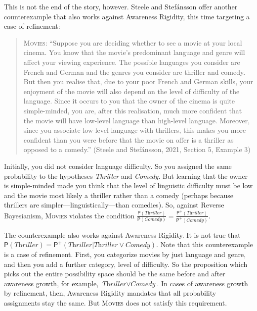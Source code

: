 \documentclass[
  11pt,
  dvipsnames,enabledeprecatedfontcommands]{scrartcl}
\newcommand{\pr}[1]{\ensuremath{\mathsf{P}(#1)}}
\newcommand{\ppr}[2]{\ensuremath{\mathsf{P}^{#1}(#2)}}
\begin{document}
This is not the end of the story, however. Steele and Stefánsson offer
another counterexample that also works against Awareness Rigidity, this
time targeting a case of refinement:

\begin{quote}
\textsc{Movies}: ``Suppose you are deciding whether to see a movie at
your local cinema. You know that the movie's predominant language and
genre will affect your viewing experience. The possible languages you
consider are French and German and the genres you consider are thriller
and comedy. But then you realise that, due to your poor French and
German skills, your enjoyment of the movie will also depend on the level
of difficulty of the language. Since it occurs to you that the owner of
the cinema is quite simple-minded, you are, after this realisation, much
more confident that the movie will have low-level language than
high-level language. Moreover, since you associate low-level language
with thrillers, this makes you more confident than you were before that
the movie on offer is a thriller as opposed to a comedy.'' (Steele and
Stefánsson, 2021, Section 5, Example 3)
\end{quote}

\noindent Initially, you did not consider language difficulty. So you
assigned the same probability to the hypotheses \textit{Thriller} and
\textit{Comedy}. But learning that the owner is simple-minded made you
think that the level of linguistic difficulty must be low and the movie
most likely a thriller rather than a comedy (perhaps because thrillers
are simpler---linguistically---than comedies). So, against Reverse
Bayesianism, \textsc{Movies} violates the condition
\(\frac{\pr{\textit{Thriller}}}{\pr{\textit{Comedy}}}=\frac{\ppr{+}{\textit{Thriller}}}{\ppr{+}{\textit{Comedy}}}\).

The counterexample also works against Awareness Rigidity. It is not true
that
\(\pr{\textit{Thriller}}=\ppr{+}{\textit{Thriller} \vert \textit{Thriller}\vee \textit{Comedy}}\).
Note that this counterexample is a case of refinement. First, you
categorize movies by just language and genre, and then you add a further
category, level of difficulty. So the proposition which picks out the
entire possibility space should be the same before and after awareness
growth, for example, \(\textit{Thriller}\vee \textit{Comedy}\). In cases
of awareness growth by refinement, then, Awareness Rigidity mandates
that all probability assignments stay the same. But \textsc{Movies} does
not satisfy this requirement.
\end{document}
